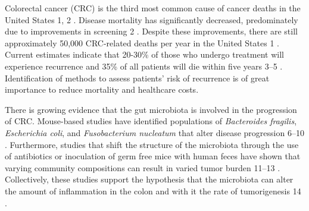 \documentclass[12pt,]{article}
\providecommand{\DIFaddtex}[1]{{\protect\color{blue}\uwave{#1}}} %
\providecommand{\DIFaddbegin}{} %
\providecommand{\DIFaddend}{} %
\providecommand{\DIFdelbegin}{} %
\providecommand{\DIFdelend}{} %
\providecommand{\DIFadd}[1]{\texorpdfstring{\DIFaddtex{#1}}{#1}} %
\begin{document}
Colorectal cancer (CRC) is the third most common cause of cancer deaths
in the United States \DIFdelbegin %
\DIFdelend \DIFaddbegin \DIFadd{(}\DIFaddend 1, 2\DIFdelbegin %
\DIFdelend \DIFaddbegin \DIFadd{)}\DIFaddend . Disease mortality has significantly
decreased, predominately due to improvements in screening \DIFdelbegin %
\DIFdelend \DIFaddbegin \DIFadd{(}\DIFaddend 2\DIFdelbegin %
\DIFdelend \DIFaddbegin \DIFadd{)}\DIFaddend . Despite
these improvements, there are still approximately 50,000 CRC-related
deaths per year in the United States \DIFdelbegin %
\DIFdelend \DIFaddbegin \DIFadd{(}\DIFaddend 1\DIFdelbegin %
\DIFdelend \DIFaddbegin \DIFadd{)}\DIFaddend . Current estimates indicate
that 20-30\% of those who undergo treatment will experience recurrence
and 35\% of all patients will die within five years \DIFdelbegin %
\DIFdelend \DIFaddbegin \DIFadd{(}\DIFaddend 3--5\DIFdelbegin %
\DIFdelend \DIFaddbegin \DIFadd{)}\DIFaddend .
Identification of methods to assess patients' risk of recurrence is of
great importance to reduce mortality and healthcare costs.

There is growing evidence that the gut microbiota is involved in the
progression of CRC. Mouse-based studies have identified populations of
\emph{Bacteroides fragilis}, \emph{Escherichia coli}, and
\emph{Fusobacterium nucleatum} that alter disease progression \DIFdelbegin %
\DIFdelend \DIFaddbegin \DIFadd{(}\DIFaddend 6--10\DIFdelbegin %
\DIFdelend \DIFaddbegin \DIFadd{)}\DIFaddend .
Furthermore, studies that shift the structure of the microbiota through
the use of antibiotics or inoculation of germ free mice with human feces
have shown that varying community compositions can result in varied
tumor burden \DIFdelbegin %
\DIFdelend \DIFaddbegin \DIFadd{(}\DIFaddend 11--13\DIFdelbegin %
\DIFdelend \DIFaddbegin \DIFadd{)}\DIFaddend . Collectively, these studies support the
hypothesis that the microbiota can alter the amount of inflammation in
the colon and with it the rate of tumorigenesis \DIFdelbegin %
\DIFdelend \DIFaddbegin \DIFadd{(}\DIFaddend 14\DIFdelbegin %
\DIFdelend \DIFaddbegin \DIFadd{)}\DIFaddend .
\end{document}
